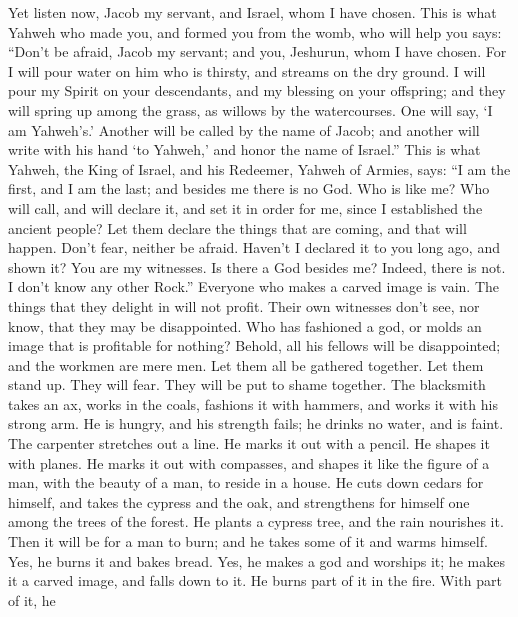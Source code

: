  Yet listen now, Jacob my servant, and Israel, whom I have
chosen.  This is what Yahweh who made you, and formed you
from the womb, who will help you says: ``Don't be afraid, Jacob my
servant; and you, Jeshurun, whom I have chosen.  For I
will pour water on him who is thirsty, and streams on the dry ground. I
will pour my Spirit on your descendants, and my blessing on your
offspring;  and they will spring up among the grass, as
willows by the watercourses.  One will say, `I am
Yahweh's.' Another will be called by the name of Jacob; and another will
write with his hand `to Yahweh,' and honor the name of Israel.''
 This is what Yahweh, the King of Israel, and his
Redeemer, Yahweh of Armies, says: ``I am the first, and I am the last;
and besides me there is no God.  Who is like me? Who will
call, and will declare it, and set it in order for me, since I
established the ancient people? Let them declare the things that are
coming, and that will happen.  Don't fear, neither be
afraid. Haven't I declared it to you long ago, and shown it? You are my
witnesses. Is there a God besides me? Indeed, there is not. I don't know
any other Rock.''  Everyone who makes a carved image is
vain. The things that they delight in will not profit. Their own
witnesses don't see, nor know, that they may be disappointed.
 Who has fashioned a god, or molds an image that is
profitable for nothing?  Behold, all his fellows will be
disappointed; and the workmen are mere men. Let them all be gathered
together. Let them stand up. They will fear. They will be put to shame
together.  The blacksmith takes an ax, works in the
coals, fashions it with hammers, and works it with his strong arm. He is
hungry, and his strength fails; he drinks no water, and is faint.
 The carpenter stretches out a line. He marks it out with
a pencil. He shapes it with planes. He marks it out with compasses, and
shapes it like the figure of a man, with the beauty of a man, to reside
in a house.  He cuts down cedars for himself, and takes
the cypress and the oak, and strengthens for himself one among the trees
of the forest. He plants a cypress tree, and the rain nourishes it.
 Then it will be for a man to burn; and he takes some of
it and warms himself. Yes, he burns it and bakes bread. Yes, he makes a
god and worships it; he makes it a carved image, and falls down to it.
 He burns part of it in the fire. With part of it, he
